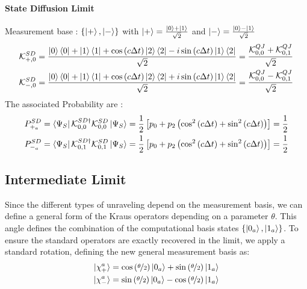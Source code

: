 \documentclass[a4paper,12pt]{article}
\begin{document}
\paragraph{State Diffusion Limit}
Measurement base : $ \{ \ket{+}, \ket{-} \} $ with $ \ket{+} = \frac{\ket{0} + \ket{1}}{\sqrt{2}} $ and $ \ket{-} = \frac{\ket{0} - \ket{1}}{\sqrt{2}} $
\begin{gather}
	\mathcal{K}_{+, 0}^{SD} = \frac{\ket{0}\bra{0} + \ket{1}\bra{1} + \cos \left( c \Delta t \right) \ket{2}\bra{2} -i \sin \left( c \Delta t \right) \ket{1}\bra{2}}{\sqrt{2}} = \frac{\mathcal{K}_{0,0}^{QJ} + \mathcal{K}_{0,1}^{QJ}}{\sqrt{2}}\\ 
	\mathcal{K}_{-, 0}^{SD} = \frac{\ket{0}\bra{0} + \ket{1}\bra{1} + \cos \left( c \Delta t \right) \ket{2}\bra{2} +i \sin \left( c \Delta t \right) \ket{1}\bra{2} }{\sqrt{2}}= \frac{\mathcal{K}_{0,0}^{QJ} - \mathcal{K}_{0,1}^{QJ}}{\sqrt{2}}
\end{gather}
The associated Probability are :
\begin{gather}
	P_{+_{a}}^{SD} = \bra{\Psi_{S}}\mathcal{K}_{0,0}^{SD \dagger} \mathcal{K}_{0,0}^{SD}\ket{\Psi_{S}} = \frac{1}{2} \left[ p_{0} + p_{2} \left(\cos^{2} \left( c \Delta t \right) + \sin^{2} \left( c \Delta t \right) \right) \right] = \frac{1}{2} \\
	P_{-_{a}}^{SD} = \bra{\Psi_{S}}\mathcal{K}_{0,1}^{SD \dagger} \mathcal{K}_{0,1}^{SD}\ket{\Psi_{S}} = \frac{1}{2} \left[ p_{0} + p_{2} \left(\cos^{2} \left( c \Delta t \right) + \sin^{2} \left( c \Delta t \right) \right) \right] = \frac{1}{2}
\end{gather}

\subsection{Intermediate Limit}
Since the different types of unraveling depend on the measurement basis, we can define a general form of the Kraus operators depending on a parameter $ \theta $. This angle defines the combination of the computational basis states $ \{ \ket{0_{a}}, \ket{1_{a}} \} $. To ensure the standard operators are exactly recovered in the limit, we apply a standard rotation, defining the new general measurement basis as: 
\begin{gather*}
	\ket{\chi_{+}^{a}} = \cos \left(\nicefrac{\theta}{2} \right) \ket{0_{a}} + \sin \left(\nicefrac{\theta}{2} \right) \ket{1_{a}} \\
	\ket{\chi_{-}^{a}} = \sin \left(\nicefrac{\theta}{2} \right) \ket{0_{a}} - \cos \left(\nicefrac{\theta}{2} \right) \ket{1_{a}}
\end{gather*}
\end{document}
